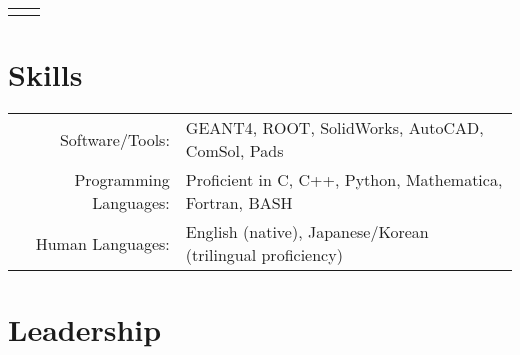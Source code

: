 \documentclass[11pt]{article} %
\begin{document}
\begin{tabularx}{\linewidth}{@{}lR@{}}
{\begin{minipage}[t]{\linewidth}
\begin{itemize}
		\end{itemize}
	\end{minipage}}\\
\end{tabularx}


\section{Skills}

\noindent\begin{tabularx}{\linewidth}{@{}rl}
	Software/Tools: & GEANT4, ROOT, SolidWorks, AutoCAD, ComSol, Pads\\
	Programming Languages: & Proficient in C, C++, Python, Mathematica, Fortran, BASH\\
	Human Languages: & English (native), Japanese/Korean (trilingual proficiency)\\
\end{tabularx}


\section{Leadership}
\end{document}

